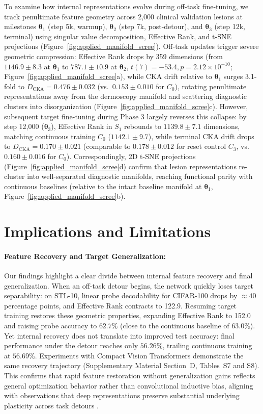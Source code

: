 \documentclass[10pt]{article}
\newcommand{\Dcka}{D_{\mathrm{CKA}}}
\begin{document}
To examine how internal representations evolve during off-task fine-tuning, we track penultimate feature geometry across 2,000 clinical validation lesions at milestones $\bm{\theta}_1$ (step 5k, warmup), $\bm{\theta}_2$ (step 7k, post-detour), and $\bm{\theta}_3$ (step 12k, terminal) using singular value decomposition, Effective Rank, and t-SNE projections (Figure~\ref{fig:applied_manifold_scree}). Off-task updates trigger severe geometric compression: Effective Rank drops by 359 dimensions (from $1146.9 \pm 8.3$ at $\bm{\theta}_1$ to $787.1 \pm 10.9$ at $\bm{\theta}_2$, $t(7) = -53.4, p = 2.12 \times 10^{-10}$; Figure~\ref{fig:applied_manifold_scree}a), while CKA drift relative to $\bm{\theta}_1$ surges 3.1-fold to $\Dcka = 0.476 \pm 0.032$ (vs.\ $0.153 \pm 0.010$ for $C_0$), rotating penultimate representations away from the dermoscopy manifold and scattering diagnostic clusters into disorganization (Figure~\ref{fig:applied_manifold_scree}c). However, subsequent target fine-tuning during Phase 3 largely reverses this collapse: by step 12,000 ($\bm{\theta}_3$), Effective Rank in $S_1$ rebounds to $1139.8 \pm 7.1$ dimensions, matching continuous training $C_0$ ($1142.1 \pm 9.7$), while terminal CKA drift drops to $\Dcka = 0.170 \pm 0.021$ (comparable to $0.178 \pm 0.012$ for reset control $C_3$, vs.\ $0.160 \pm 0.016$ for $C_0$). Correspondingly, 2D t-SNE projections (Figure~\ref{fig:applied_manifold_scree}d) confirm that lesion representations re-cluster into well-separated diagnostic manifolds, reaching functional parity with continuous baselines (relative to the intact baseline manifold at $\bm{\theta}_1$, Figure~\ref{fig:applied_manifold_scree}b).

\section{Implications and Limitations}\label{sec:discussion}

\paragraph{Feature Recovery and Target Generalization:}
Our findings highlight a clear divide between internal feature recovery and final generalization. When an off-task detour begins, the network quickly loses target separability: on STL-10, linear probe decodability for CIFAR-100 drops by $\approx 40$ percentage points, and Effective Rank contracts to 122.9. Resuming target training restores these geometric properties, expanding Effective Rank to 152.0 and raising probe accuracy to $62.7\%$ (close to the continuous baseline of $63.0\%$). Yet internal recovery does not translate into improved test accuracy: final performance under the detour reaches only $56.26\%$, trailing continuous training at $56.69\%$. Experiments with Compact Vision Transformers demonstrate the same recovery trajectory (Supplementary Material Section~D, Tables~S7 and S8). This confirms that rapid feature restoration without generalization gains reflects general optimization behavior rather than convolutional inductive bias, aligning with observations that deep representations preserve substantial underlying plasticity across task detours \cite{lyle2023plasticity,dohare2024continual}.
\end{document}
